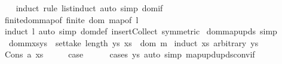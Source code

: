 \begin{isabellebody}
%
\isadelimproof
\ \ %
\endisadelimproof
%
\isatagproof
{}\isamarkupfalse%
\ {\isacharparenleft}{\kern0pt}induct\ rule{\isacharcolon}{\kern0pt}\ list{\isacharunderscore}{\kern0pt}induct{}{\isacharparenright}{\kern0pt}\ {\isacharparenleft}{\kern0pt}auto\ simp{\isacharcolon}{\kern0pt}\ dom{\isacharunderscore}{\kern0pt}if{\isacharparenright}{\kern0pt}%
\endisatagproof
{\isafoldproof}%
%
\isadelimproof
\isanewline
%
\endisadelimproof
\isanewline
{}\isamarkupfalse%
\ finite{\isacharunderscore}{\kern0pt}dom{\isacharunderscore}{\kern0pt}map{\isacharunderscore}{\kern0pt}of{\isacharcolon}{\kern0pt}\ {\isachardoublequoteopen}finite\ {\isacharparenleft}{\kern0pt}dom\ {\isacharparenleft}{\kern0pt}map{\isacharunderscore}{\kern0pt}of\ l{\isacharparenright}{\kern0pt}{\isacharparenright}{\kern0pt}{\isachardoublequoteclose}\isanewline
%
\isadelimproof
\ \ %
\endisadelimproof
%
\isatagproof
{}\isamarkupfalse%
\ {\isacharparenleft}{\kern0pt}induct\ l{\isacharparenright}{\kern0pt}\ {\isacharparenleft}{\kern0pt}auto\ simp{\isacharcolon}{\kern0pt}\ dom{\isacharunderscore}{\kern0pt}def\ insert{\isacharunderscore}{\kern0pt}Collect\ {\isacharbrackleft}{\kern0pt}symmetric{\isacharbrackright}{\kern0pt}{\isacharparenright}{\kern0pt}%
\endisatagproof
{\isafoldproof}%
%
\isadelimproof
\isanewline
%
\endisadelimproof
\isanewline
{}\isamarkupfalse%
\ dom{\isacharunderscore}{\kern0pt}map{\isacharunderscore}{\kern0pt}upds\ {\isacharbrackleft}{\kern0pt}simp{\isacharbrackright}{\kern0pt}{\isacharcolon}{\kern0pt}\isanewline
\ \ {\isachardoublequoteopen}dom{\isacharparenleft}{\kern0pt}m{\isacharparenleft}{\kern0pt}xs{\isacharbrackleft}{\kern0pt}{\isasymmapsto}{\isacharbrackright}{\kern0pt}ys{\isacharparenright}{\kern0pt}{\isacharparenright}{\kern0pt}\ {\isacharequal}{\kern0pt}\ set{\isacharparenleft}{\kern0pt}take\ {\isacharparenleft}{\kern0pt}length\ ys{\isacharparenright}{\kern0pt}\ xs{\isacharparenright}{\kern0pt}\ {\isasymunion}\ dom\ m{\isachardoublequoteclose}\isanewline
%
\isadelimproof
%
\endisadelimproof
%
\isatagproof
{}\isamarkupfalse%
\ {\isacharparenleft}{\kern0pt}induct\ xs\ arbitrary{\isacharcolon}{\kern0pt}\ ys{\isacharparenright}{\kern0pt}\isanewline
\ \ \isamarkupfalse%
\ {\isacharparenleft}{\kern0pt}Cons\ a\ xs{\isacharparenright}{\kern0pt}\isanewline
\ \ \isamarkupfalse%
\ \isamarkupfalse%
\ {\isacharquery}{\kern0pt}case\isanewline
\ \ \ \ \isamarkupfalse%
\ {\isacharparenleft}{\kern0pt}cases\ ys{\isacharparenright}{\kern0pt}\ {\isacharparenleft}{\kern0pt}auto\ simp{\isacharcolon}{\kern0pt}\ map{\isacharunderscore}{\kern0pt}upd{\isacharunderscore}{\kern0pt}upds{\isacharunderscore}{\kern0pt}conv{\isacharunderscore}{\kern0pt}if{\isacharparenright}{\kern0pt}\isanewline

\end{isabellebody}
